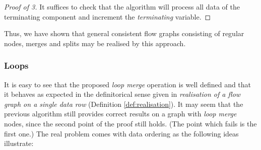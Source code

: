 \begin{proof}[Proof of 3]
It suffices to check that the algorithm will process all data of the terminating component and increment the \emph{terminating} variable.
\end{proof}
\myendclaim

Thus, we have shown that general consistent flow graphs consisting of regular nodes, merges and splits may be realised by this approach.

\subsubsection{Loops}

It is easy to see that the proposed \emph{loop merge} operation is well defined and that it behaves as expected in the definitorical sense given in \emph{realisation of a flow graph on a single data row} (Definition \ref{def:realisation}). It may seem that the previous algorithm still provides correct results on a graph with \emph{loop merge} nodes, since the second point of the proof still holds. (The point which fails is the first one.) The real problem comes with data ordering as the following ideas illustrate:

